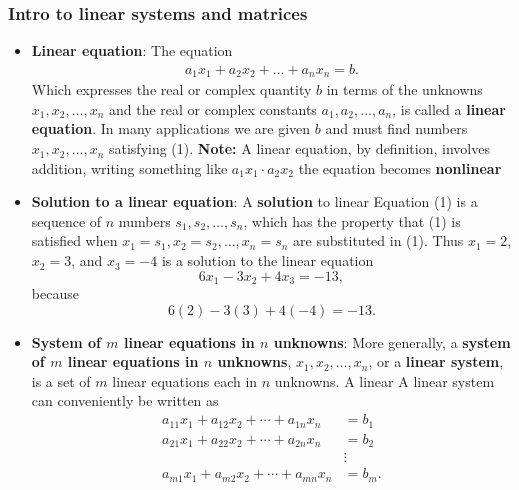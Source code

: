 \documentclass{report}
\begin{document}
    \pagebreak 
    \subsubsection{Intro to linear systems and matrices}
    \begin{itemize}
                \item \textbf{Linear equation}: The equation
            \begin{align*}
                a_{1}x_{1} + a_{2}x_{2} + ... + a_{n}x_{n} = b  \tag{1}
            .\end{align*}
            Which expresses the real or complex quantity \(b\) in terms of the unknowns \(x_1, x_2, \ldots, x_n\) and the real or complex constants \(a_1, a_2, \ldots, a_n\), is called a \textbf{linear equation}. In many applications we are given \(b\) and must find numbers \(x_1, x_2, \ldots, x_n\) satisfying (1).
            \bigbreak \noindent 
            \textbf{Note:} A linear equation, by definition, involves addition, writing something like $a_{1}x_{1} \cdot  a_{2}x_{2} $ the equation becomes \textbf{nonlinear}
        \item \textbf{Solution to a linear equation}:
            A \textbf{solution} to linear Equation (1) is a sequence of \(n\) numbers \(s_1, s_2, \ldots, s_n\), which has the property that (1) is satisfied when \(x_1 = s_1, x_2 = s_2, \ldots, x_n = s_n\) are substituted in (1). Thus \(x_1 = 2\), \(x_2 = 3\), and \(x_3 = -4\) is a solution to the linear equation
            \[
                6x_1 - 3x_2 + 4x_3 = -13,
            \]
            because
            \[
                6(2) - 3(3) + 4(-4) = -13.
            \]
        \item \textbf{System of $m$ linear equations in $n$ unknowns}:
            More generally, a \textbf{system of \(m\) linear equations in \(n\) unknowns}, \(x_1, x_2, \ldots, x_n\), or a \textbf{linear system}, is a set of \(m\) linear equations each in \(n\) unknowns. A linear
            \bigbreak \noindent 
            A linear system can conveniently be written as
            \[
                \begin{aligned}
                    a_{11}x_1 + a_{12}x_2 + \cdots + a_{1n}x_n &= b_1 \\
                    a_{21}x_1 + a_{22}x_2 + \cdots + a_{2n}x_n &= b_2 \\
                                                               &\vdots \\
                    a_{m1}x_1 + a_{m2}x_2 + \cdots + a_{mn}x_n &= b_m.

\end{aligned}\]
\end{itemize}
\end{document}
